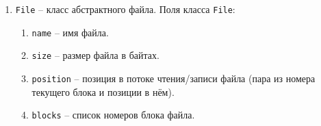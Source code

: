 \begin{enumerate}
\begin{enumerate}
		\begin{enumerate}
			\item \texttt{name} -- название файла;
			\item \texttt{size} -- размер файла в байтах. Для каталогов равно 0;
			\item \texttt{create-date} -- дата создания файла, если нет в конкретной файловой системе, то равно \texttt{nil};
			\item \texttt{create-time} -- время создания файла, если нет в конкретной файловой системе, то равно \texttt{nil};
			\item \texttt{modify-date} -- дата последнего изменения файла, если нет в конкретной файловой системе, то равно \texttt{nil};
			\item \texttt{modify-time} -- время последнего изменения файла, если нет в конкретной файловой системе, то равно \texttt{nil};
			\item \texttt{access-date} -- дата последнего доступа файла, если нет в конкретной файловой системе, то равно \texttt{nil};
			\item \texttt{access-date} -- время последнего изменения файла, если нет в конкретной файловой системе, то равно \texttt{nil};
			\item \texttt{isdir} -- флаг, показывающий, является ли файл каталогом;
			\item другие атрибуты, которые зависят от конкретной файловой системы.
		\end{enumerate}
		
		\item \texttt{new-block} -- добавить новый блок к файлу. Аргументы: \texttt{file-object}(объект файла, к которому необходимо добавить новый блок). Возвращает \texttt{nil}.
		
	\end{enumerate}
	
	\item \texttt{File} -- класс абстрактного файла. Поля класса \texttt{File}:
	
	\begin{enumerate}
		\item \texttt{name} -- имя файла.
		\item \texttt{size} -- размер файла в байтах.
		\item \texttt{position} -- позиция в потоке чтения/записи файла (пара из номера текущего блока и позиции в нём).
		\item \texttt{blocks} -- список номеров блока файла.
	\end{enumerate}
	

\end{enumerate}
